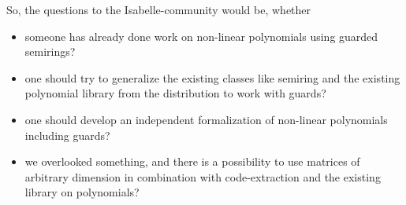 \documentclass[a4paper]{llncs}
\begin{document}
So, the questions to the Isabelle-community would be, whether
\begin{itemize}
\item someone has already done work on non-linear polynomials using guarded semirings?
\item one should try to generalize the existing classes like semiring 
  and the existing polynomial library from the
  distribution to work with guards?
\item one should develop an independent formalization
  of non-linear polynomials including guards?
\item we overlooked something, and there is a possibility to use matrices
  of arbitrary dimension in combination with code-extraction and 
  the existing library on
  polynomials?
\end{itemize}






\end{document}
